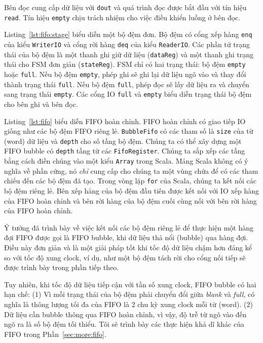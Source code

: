 \documentclass[%
    10pt,
    headinclude, footexclude,
    openright, %
    notitlepage,
    cleardoubleempty,
    headsepline,
    pointlessnumbers,
    bibtotoc, idxtotoc,
    ]{scrbook}
\newcommand{\code}[1]{{\small{\texttt{#1}}}}
\begin{document}
Bên đọc cung cấp dữ liệu với \code{dout} và quá trình đọc được bắt đầu với tín hiệu \code{read}. Tín hiệu \code{empty} chịu trách nhiệm cho việc điều khiển luồng ở bên đọc.


Listing~\ref{lst:fifo:stage} biểu diễn một bộ đệm đơn. Bộ đệm có cổng xếp hàng \code{enq} của kiểu \code{WriterIO} và cổng rời hàng \code{deq} của kiểu \code{ReaderIO}. Các phần tử trạng thái của bộ đệm là một thanh ghi giữ dữ liệu (\code{dataReg}) và một thanh ghi trạng thái cho FSM đơn giản (\code{stateReg}). FSM chỉ có hai trạng thái: bộ đệm \code{empty} hoặc \code{full}. Nếu bộ đệm \code{empty}, phép ghi sẽ ghi lại dữ liệu ngõ vào và thay đổi thành trạng thái \code{full}. Nếu bộ đệm \code{full}, phép đọc sẽ lấy dữ liệu ra và chuyển sang trạng thái \code{empty}. Các cổng IO \code{full} và \code{empty} biểu diễn trạng thái bộ đệm cho bên ghi và bên đọc. 



Listing~\ref{lst:fifo} biểu diễn FIFO hoàn chỉnh. FIFO hoàn chỉnh có giao tiếp IO giống như các bộ đệm FIFO riêng lẻ. \code{BubbleFifo} có các tham số là \code{size} của từ (word) dữ liệu và \code{depth} cho số tầng bộ đệm. Chúng ta có thể xây dựng một FIFO bubble có \code{depth} tầng từ các \code{FifoRegister}. Chúng ta sắp xếp các tầng bằng cách điền chúng vào một kiểu \code{Array} trong Scala. Mảng Scala không có ý nghĩa về phần cứng, nó \emph{chỉ} cung cấp cho chúng ta một vùng chứa để có các tham chiếu đến các bộ đệm đã tạo. Trong vòng lặp \code{for} của Scala, chúng ta kết nối các bộ đệm riêng lẻ. Bên xếp hàng của bộ đệm đầu tiên được kết nối với IO xếp hàng của FIFO hoàn chỉnh và bên rời hàng của bộ đệm cuối cùng nối với bên rời hàng của FIFO hoàn chỉnh. 


Ý tưởng đã trình bày về việc kết nối các bộ đệm riêng lẻ để thực hiện một hàng đợi FIFO được gọi là FIFO bubble, khi dữ liệu thả nổi (bubble) qua hàng đợi. Điều này đơn giản và là một giải pháp tốt khi tốc độ dữ liệu chậm hơn đáng kể so với tốc độ xung clock, ví dụ, như một bộ đệm tách rời cho cổng nối tiếp sẽ được trình bày trong phần tiếp theo.

Tuy nhiên, khi tốc độ dữ liệu tiếp cận với tần số xung clock, FIFO bubble có hai hạn chế: (1) Vì mỗi trạng thái của bộ đệm phải chuyển đổi giữa \emph{blank} và \emph{full}, có nghĩa là thông lượng tối đa của FIFO là 2 chu kỳ xung clock mỗi từ (word). (2) Dữ liệu cần bubble thông qua FIFO hoàn chỉnh, vì vậy, độ trễ từ ngõ vào đến ngõ ra là số bộ đệm tối thiểu. Tôi sẽ trình bày các thực hiện khả dĩ khác của FIFO trong Phần~\ref{sec:more:fifo}. 
\end{document}
